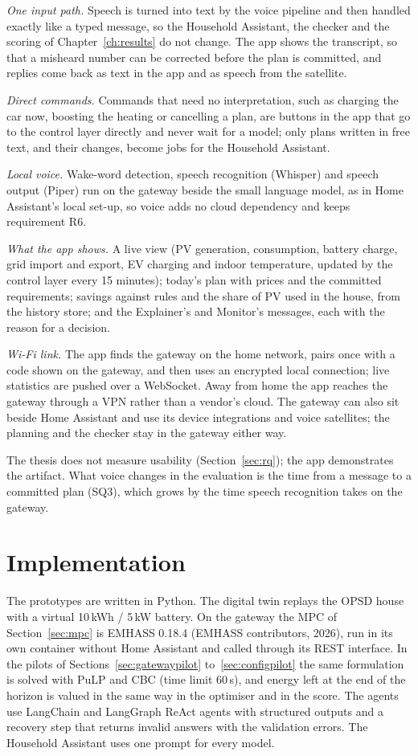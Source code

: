 \documentclass[12pt,a4paper]{report}
\begin{document}
\textit{One input path.} Speech is turned into text by the voice
pipeline and then handled exactly like a typed message, so the Household Assistant,
the checker and the scoring of Chapter~\ref{ch:results} do not change.
The app shows the transcript, so that a misheard number can be corrected
before the plan is committed, and replies come back as text in the app
and as speech from the satellite.

\textit{Direct commands.} Commands that need no interpretation, such as
charging the car now, boosting the heating or cancelling a plan, are
buttons in the app that go to the control layer directly and never wait
for a model; only plans written in free text, and their changes, become
jobs for the Household Assistant.

\textit{Local voice.} Wake-word detection, speech recognition (Whisper)
and speech output (Piper) run on the gateway beside the small language
model, as in Home Assistant's local set-up, so voice adds no cloud
dependency and keeps requirement R6.

\textit{What the app shows.} A live view (PV generation, consumption,
battery charge, grid import and export, EV charging and indoor
temperature, updated by the control layer every 15 minutes); today's
plan with prices and the committed requirements; savings against rules
and the share of PV used in the house, from the history store; and the
Explainer's and Monitor's messages, each with the reason for a decision.

\textit{Wi-Fi link.} The app finds the gateway on the home network,
pairs once with a code shown on the gateway, and then uses an encrypted
local connection; live statistics are pushed over a WebSocket. Away
from home the app reaches the gateway through a VPN rather than a
vendor's cloud. The gateway can also sit beside Home Assistant and use
its device integrations and voice satellites; the planning and the
checker stay in the gateway either way.

The thesis does not measure usability (Section~\ref{sec:rq}); the app
demonstrates the artifact. What voice changes in the evaluation is the
time from a message to a committed plan (SQ3), which grows by the time
speech recognition takes on the gateway.

\section{Implementation}
\label{sec:implementation}

The prototypes are written in Python. The digital twin replays the
OPSD house with a virtual 10\,kWh / 5\,kW battery. On the gateway the
MPC of Section~\ref{sec:mpc} is EMHASS 0.18.4 (EMHASS contributors, 2026), run in
its own container without Home Assistant and called through its REST
interface. In the pilots of Sections~\ref{sec:gatewaypilot}
to~\ref{sec:configpilot} the same formulation is solved with PuLP and CBC
(time limit 60\,s), and energy left at the end of the horizon is valued
in the same way in the optimiser and in the score. The agents use LangChain and LangGraph ReAct agents with
structured outputs and a recovery step that returns invalid answers with
the validation errors. The Household Assistant uses one prompt for
every model.
\end{document}
